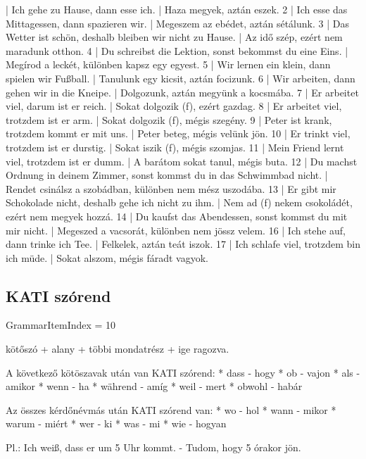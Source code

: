 \documentclass{article}
\newenvironment{desc}{\verbatim}{\endverbatim}
\newenvironment{exmp}{\verbatim}{\endverbatim}
\begin{document}
\begin{exmp}
1 | Ich gehe zu Hause, dann esse ich. | Haza megyek, aztán eszek.
2 | Ich esse das Mittagessen, dann spazieren wir. | Megeszem az ebédet, aztán sétálunk.
3 | Das Wetter ist schön, deshalb bleiben wir nicht zu Hause. | Az idő szép, ezért nem maradunk otthon.
4 | Du schreibst die Lektion, sonst bekommst du eine Eins. | Megírod a leckét, különben kapsz egy egyest.
5 | Wir lernen ein klein, dann spielen wir Fußball. | Tanulunk egy kicsit, aztán focizunk.
6 | Wir arbeiten, dann gehen wir in die Kneipe. | Dolgozunk, aztán megyünk a kocsmába.
7 | Er arbeitet viel, darum ist er reich. | Sokat dolgozik (f), ezért gazdag.
8 | Er arbeitet viel, trotzdem ist er arm. | Sokat dolgozik (f), mégis szegény.
9 | Peter ist krank, trotzdem kommt er mit uns. | Peter beteg, mégis velünk jön.
10 | Er trinkt viel, trotzdem ist er durstig. | Sokat iszik (f), mégis szomjas.
11 | Mein Friend lernt viel, trotzdem ist er dumm. | A barátom sokat tanul, mégis buta.
12 | Du machst Ordnung in deinem Zimmer, sonst kommst du in das Schwimmbad nicht. | Rendet csinálsz a szobádban, különben nem mész uszodába.
13 | Er gibt mir Schokolade nicht, deshalb gehe ich nicht zu ihm. | Nem ad (f) nekem csokoládét, ezért nem megyek hozzá.
14 | Du kaufst das Abendessen, sonst kommst du mit mir nicht. | Megeszed a vacsorát, különben nem jössz velem.
16 | Ich stehe auf, dann trinke ich Tee. | Felkelek, aztán teát iszok.
17 | Ich schlafe viel, trotzdem bin ich müde. | Sokat alszom, mégis fáradt vagyok.
\end{exmp}

\subsection{KATI szórend}

GrammarItemIndex = 10

\begin{desc}
kötőszó + alany + többi mondatrész + ige ragozva.

A következő kötöszavak után van KATI szórend:
* dass - hogy
* ob - vajon
* als - amikor
* wenn - ha
* während - amíg
* weil - mert
* obwohl - habár

Az összes kérdőnévmás után KATI szórend van:
* wo - hol
* wann - mikor
* warum - miért
* wer - ki
* was - mi
* wie - hogyan

Pl.: Ich weiß, dass er um 5 Uhr kommt. - Tudom, hogy 5 órakor jön.
\end{desc}
\end{document}
